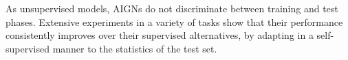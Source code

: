 \documentclass[10pt,twocolumn,letterpaper]{article}
\newcommand\todo[1]{\textcolor{red}{#1}}
\begin{document}
\begin{bibunit}[ieee]
\begin{comment}

We test our AIGN model in the following tasks: (a) 3D human pose estimation from a single image, where it outperforms both a supervised model and the 3D interpreter model of  \cite{Wu2016} (which does not have adversarial priors). (b) Learning egomotion and 3D depth given a pair of frames (\ie, structure from motion), where it outperforms the geometric baseline of Jaegle \etal \cite{DBLP:conf/icra/JaeglePD16} in the synthetic Virtual KITTI dataset \cite{Gaidon:Virtual:CVPR2016} and handles  the well-known scale ambiguity of monocular 3D reconstruction, in which inverse rendering alone is susceptible to. %
(c) Super-resolution and inpainting, where it generates  effective gender and age transformations, and identity mixing, and outperform the work of Attribute2image  \cite{DBLP:journals/corr/YanYSL15}. 
\end{comment}

As unsupervised models, AIGNs do not discriminate between training and test phases. %
Extensive experiments in a variety of tasks show that their performance consistently improves over their supervised alternatives, by adapting in a self-supervised manner to the statistics of the test set.

%

\end{bibunit}
\end{document}
